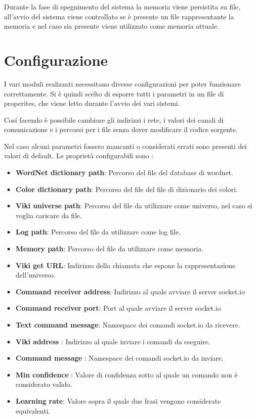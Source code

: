 \documentclass[twoside]{supsistudent}
\begin{document}
Durante la fase di spegnimento del sistema la memoria viene persistita su file, all'avvio del sistema viene controllato se è presente un file rappresentante la memoria e nel caso sia presente viene utilizzato come memoria attuale.

\chapter{Configurazione}
I vari moduli realizzati necessitano diverse configurazioni per poter funzionare correttamente. Si è quindi scelto di esporre tutti i parametri in un file di properites, che viene letto durante l'avvio dei vari sistemi. 

Cosí facendo è possibile cambiare gli indirizzi i rete, i valori dei canali di comunicazione e i percorsi per i file senza dover modificare il codice sorgente.

Nel caso alcuni parametri fossero mancanti o considerati errati sono presenti dei valori di default.
Le proprietà configurabili sono :
\begin{itemize}

  \item \textbf{WordNet dictionary path}: Percorso del file del database di wordnet.
   \item \textbf{Color dictionary path}: Percorso del file del file di dizionario dei colori.
      \item \textbf{Viki universe path}: Percorso del file da utilizzare come universo, nel caso si voglia caricare da file.
      \item \textbf{Log path}: Percorso del file da utilizzare come log file.
      \item \textbf{Memory path}: Percorso del file da utilizzare come memoria.
      \item \textbf{Viki get URL}: Indirizzo della chiamata che espone la rappresentazione dell'universo.
      \item \textbf{Command receiver address}: Indirizzo al quale avviare il server socket.io
      \item \textbf{Command receiver port}: Port al quale avviare il server socket.io
      \item \textbf{Text command message}: Namespace dei comandi socket.io da ricevere.
      \item \textbf{Viki address }: Indirizzo al quale inviare i comandi da eseguire.
      \item \textbf{Command message }: Namespace dei comandi socket.io da inviare.
      \item \textbf{Min confidence }: Valore di confidenza sotto al quale un comando non è considerato valido.
      \item \textbf{Learning rate}: Valore sopra il quale due frasi vengono considerate equivalenti.
\end{itemize}
\end{document}

